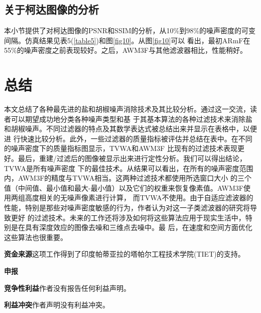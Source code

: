 \documentclass[12pt]{article} %
\begin{document}
\subsection{关于柯达图像的分析}
本小节提供了对柯达图像的PSNR和SSIM的分析，从10\%到98\%的噪声密度的可变间隔。仿真结果见表5(\ref{table5})和图\ref{fig10}。从图\ref{fig10}可以
看出，最初ARmF\cite{ref8}在55\%的噪声密度之前表现较好。之后，AWM3F\cite{ref23}与其他滤波器相比，性能稍好。

\section{总结\label{sec:5}}
本文总结了各种最先进的盐和胡椒噪声消除技术及其比较分析。通过这一交流，读者可以期望成功地分类各种噪声类型和基
于其基本算法的各种过滤技术来消除盐和胡椒噪声。不同过滤器的特点及其数学表达式被总结出来并显示在表格中，以便进
行快速比较分析。此外，一些过滤器的质量指标被评估并总结在表中。在不同的噪声密度下的质量指标图显示，TVWA和AWM3F
比现有的过滤技术表现更好。最后，重建/过滤后的图像被显示出来进行定性分析。我们可以得出结论，TVWA是所有噪声密度
下的最佳技术。从结果可以看出，在所有的噪声密度范围内，AWM3F的精度与TVWA相当。这两种过滤技术都使用所选窗口大小
的三个值（中间值、最小值和最大-最小值）以及它们的权重来恢复像素值。AWM3F使用两组高度相关的无噪声像素进行计算，
而TVWA不使用。由于自适应滤波器的性能，特别是那些对噪声密度敏感的行为，作者认为对这一子类滤波器的研究将导致更好
的过滤技术。未来的工作还将涉及如何将这些算法应用于现实生活中，特别是在具有深度效应的图像去噪和三维点去噪中。最
后，在速度和空间方面优化这些算法也很重要。

\vspace{1em}

\textbf{资金来源}\hspace{2em}这项工作得到了印度帕蒂亚拉的塔帕尔工程技术学院(TIET)的支持。

\vspace{1em}

\textbf{申报}

\vspace{1em}

\textbf{竞争性利益}\hspace{2em}作者没有报告任何利益声明。

\vspace{1em}

\textbf{利益冲突}\hspace{2em}作者声明没有利益冲突。

\printbibliography

\end{document}
